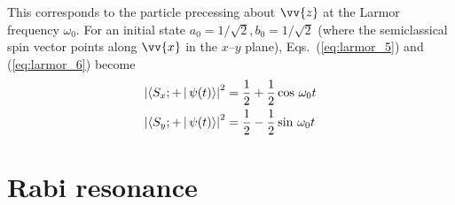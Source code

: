 %
This corresponds to the particle precessing about $\vv{z}$ at the Larmor frequency $\omega_0$. For an initial state $a_0=1/\sqrt{2}, b_0=1/\sqrt{2}$ (where the semiclassical spin vector points along $\vv{x}$ in the $x$--$y$ plane), Eqs.~(\ref{eq:larmor_5}) and (\ref{eq:larmor_6}) become
%
\begin{align}
    \left| \Braket{S_x;+ | \psi(t)} \right|^2&= \frac{1}{2} + \frac{1}{2}\cos\,\omega_0t \\
    \left| \Braket{S_y;+ | \psi(t)} \right|^2&= \frac{1}{2} - \frac{1}{2}\sin\,\omega_0t 
\end{align}


\section{Rabi resonance\label{sec:rabi}}


